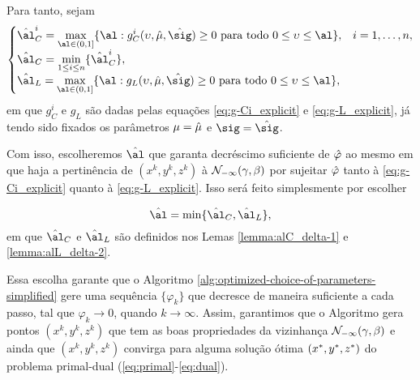 Para tanto, sejam  
\begin{equation}
	\label{eq:al-C+al-L}
\begin{cases}
	\hat{\al}_{C}^{i} = \displaystyle \max_{\al\in (0,1]} \{ \al : g_{C}^{i}(\upsilon,\nextmu,\nextsig)\geq0 \text{ para todo } 0 \leq \upsilon\leq \al  \}, & i = 1,\ldots,n,\\
	\hat{\al}_{C} = \displaystyle \min_{1\leq i \leq n} \{\hat{\al}_{C}^{i}\}, \\
	\hat{\al}_{L} = \displaystyle \max_{\al\in (0,1]} \{ \al : g_{L}(\upsilon,\nextmu,\nextsig)\geq0 \text{ para todo } 0 \leq  \upsilon\leq \al  \},
\end{cases}
\end{equation}
em que $g_{C}^{i}$ e $g_{L}$ são dadas pelas equações  \eqref{eq:g-Ci_explicit} e \eqref{eq:g-L_explicit}, já tendo sido fixados os parâmetros $\mu=\hat{\mu}$ e $\sig=\nextsig$.


Com isso, escolheremos  $\hat\al$ que garanta decréscimo suficiente de $\hat{\varphi}$ ao mesmo em que haja a pertinência de $({x}^{k} ,{y}^{k},{z}^{k})$ à $\mathcal{N}_{-\infty}(\gamma,\beta)$ por sujeitar $\hat{\varphi}$ tanto à  \eqref{eq:g-Ci_explicit} quanto à \eqref{eq:g-L_explicit}. Isso será feito simplesmente por escolher

\begin{equation}
	\label{eq:nex-al}
\nextal = \min\{\nextal_{C},\nextal_{L}\},
\end{equation}
em que $\nextal_{C}$ e $\nextal_{L}$ são definidos nos Lemas \ref{lemma:alC_delta-1} e  \ref{lemma:alL_delta-2}.

  




 Essa escolha garante que  o Algoritmo \ref{alg:optimized-choice-of-parameters-simplified} gere uma sequência $\{\varphi_k\}$ que decresce de maneira suficiente a cada passo, tal que $\varphi_k \to 0$, quando $k\to \infty$. Assim, garantimos que o Algoritmo gera pontos $({x}^{k} ,{y}^{k},{z}^{k})$ que tem as boas propriedades da vizinhança $\mathcal{N}_{-\infty}(\gamma,\beta)$ e ainda que $({x}^{k} ,{y}^{k},{z}^{k})$ convirga para  alguma solução ótima $(x^* ,y^*,z^*)$ do problema primal-dual  (\ref{eq:primal}-\ref{eq:dual}).




